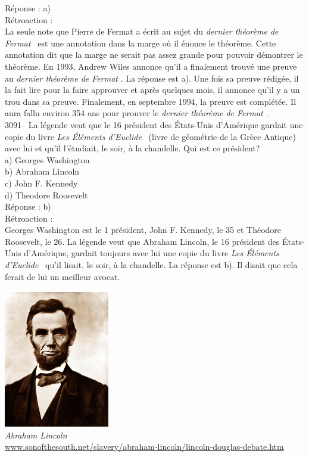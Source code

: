 \documentclass[letterpaper, 12pt]{article}
\begin{document}
R\'eponse : a)\\

R\'etroaction :\\
La seule note que Pierre de Fermat a \'ecrit au sujet du \og \emph{dernier th\'eor\`eme de Fermat} \fg \ est une annotation dans la marge o\`u il \'enonce le th\'eor\`eme. Cette annotation dit que la marge ne serait pas assez grande pour pouvoir d\'emontrer le th\'eor\`eme. En 1993, Andrew Wiles annonce qu'il a finalement trouv\'e une preuve au \og \emph{dernier th\'eor\`eme de Fermat} \fg. La r\'eponse est a). Une fois sa preuve r\'edig\'ee, il la fait lire pour la faire approuver et apr\`es quelques mois, il annonce qu'il y a un trou dans sa preuve. Finalement, en septembre 1994, la preuve est compl\'et\'ee. Il aura fallu environ 354 ans pour prouver le \og \emph{dernier th\'eor\`eme de Fermat} \fg.\\



3091-- La l\'egende veut que le 16\ieme{} pr\'esident des \'Etats-Unis d'Am\'erique gardait une copie du livre \og \emph{Les \'El\'ements d'Euclide} \fg \ (livre de g\'eom\'etrie de la Gr\`ece Antique) avec lui et qu'il l'\'etudiait, le soir, \`a la chandelle. Qui est ce pr\'esident?\\

a) Georges Washington\\
b) Abraham Lincoln\\
c) John F. Kennedy\\
d) Theodore Roosevelt\\

R\'eponse : b)\\

R\'etroaction :\\
Georges Washington est le 1\ier{} pr\'esident, John F. Kennedy, le 35\ieme{} et Th\'eodore Roosevelt, le 26\ieme{}. La l\'egende veut que Abraham Lincoln, le 16\ieme{} pr\'esident des \'Etats-Unis d'Am\'erique, gardait toujours avec lui une copie du livre \og \emph{Les \'El\'ements d'Euclide} \fg \ qu'il lisait, le soir, \`a la chandelle. La r\'eponse est b). Il disait que cela ferait de lui un meilleur avocat.
\begin{center}
\includegraphics[]{Lincoln.eps}\\
\emph{{\small Abraham Lincoln}}\\
\href{http://www.sonofthesouth.net/slavery/abraham-lincoln/lincoln-douglas-debate.htm}{www.sonofthesouth.net/slavery/abraham-lincoln/lincoln-douglas-debate.htm}\\[5mm]
\end{center}
\end{document}
